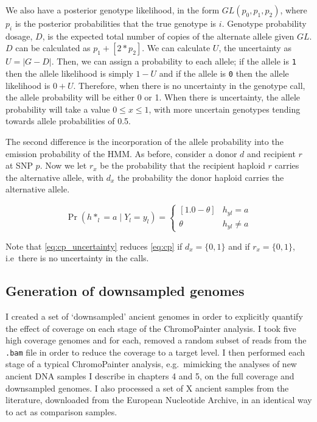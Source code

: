 {We also have a posterior genotype likelihood, in the form $GL(p_{0}, p_{1}, p_{2})$, where $p_i$ is the posterior probabilities that the true genotype is $i$. Genotype probability dosage, $D$, is the expected total number of copies of the alternate allele given $GL$. $D$ can be calculated as $p_{1} + [2*p_{2}]$. We can calculate $U$, the uncertainty as $U = |G-D|$. Then, we can assign a probability to each allele; if the allele is \texttt{1} then the allele likelihood is simply $1 - U$ and if the allele is \texttt{0} then the allele likelihood is $0 + U$. Therefore, when there is no uncertainty in the genotype call, the allele probability will be either 0 or 1. When there is uncertainty, the allele probability will take a value $0 \leq x \leq 1$, with more uncertain genotypes tending towards allele probabilities of 0.5. 
                 
The second difference is the incorporation of the allele probability into the emission probability of the HMM. As before, consider a donor $d$ and recipient $r$ at SNP $p$. Now we let $r_x$ be the probability that the recipient haploid $r$ carries the alternative allele, with $d_x$ the probability the donor haploid carries the alternative allele.

\begin{equation} \label{eq:cp_uncertainty}
\Pr(h*_{l} = a \mid Y_{l} = y_{l}) =     
	\begin{cases}
		[1.0 - \theta]  & h_{yl} = a \\
		\theta & h_{yl} \neq a 
	\end{cases}       
\end{equation}

Note that \ref{eq:cp_uncertainty} reduces \ref{eq:cp} if $d_{x} = \{0,1\}$ and if $r_{x} = \{0,1\}$, i.e\ there is no uncertainty in the calls.


\subsection{Generation of downsampled genomes}

I created a set of `downsampled' ancient genomes in order to explicitly quantify the effect of coverage on each stage of the ChromoPainter analysis. I took five high coverage genomes and for each, removed a random subset of reads from the \texttt{.bam} file in order to reduce the coverage to a target level. I then performed each stage of a typical ChromoPainter analysis, e.g.\ mimicking the analyses of new ancient DNA samples I describe in chapters 4 and 5, on the full coverage and downsampled genomes. I also processed a set of X ancient samples from the literature, downloaded from the European Nucleotide Archive, in an identical way to act as comparison samples. 

}
